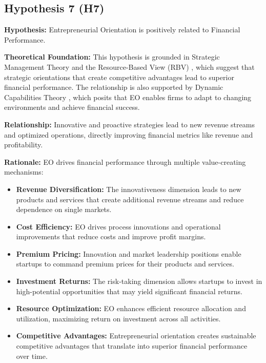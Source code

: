 \documentclass[../Main.tex]{subfiles}
\begin{document}
    \subsection{Hypothesis 7 (H7)}
    \textbf{Hypothesis:} Entrepreneurial Orientation is positively related to Financial Performance.
    
    \textbf{Theoretical Foundation:} This hypothesis is grounded in Strategic Management Theory \cite{porter1980competitive} and the Resource-Based View (RBV) \cite{barney1991firm}, which suggest that strategic orientations that create competitive advantages lead to superior financial performance. The relationship is also supported by Dynamic Capabilities Theory \cite{teece1997dynamic}, which posits that EO enables firms to adapt to changing environments and achieve financial success.
    
    \textbf{Relationship:} Innovative and proactive strategies lead to new revenue streams and optimized operations, directly improving financial metrics like revenue and profitability.
    
    \textbf{Rationale:} EO drives financial performance through multiple value-creating mechanisms:
    \begin{itemize}
        \item \textbf{Revenue Diversification:} The innovativeness dimension leads to new products and services that create additional revenue streams and reduce dependence on single markets.
        \item \textbf{Cost Efficiency:} EO drives process innovations and operational improvements that reduce costs and improve profit margins.
        \item \textbf{Premium Pricing:} Innovation and market leadership positions enable startups to command premium prices for their products and services.
        \item \textbf{Investment Returns:} The risk-taking dimension allows startups to invest in high-potential opportunities that may yield significant financial returns.
        \item \textbf{Resource Optimization:} EO enhances efficient resource allocation and utilization, maximizing return on investment across all activities.
        \item \textbf{Competitive Advantages:} Entrepreneurial orientation creates sustainable competitive advantages that translate into superior financial performance over time.
    \end{itemize}
    
\end{document}
